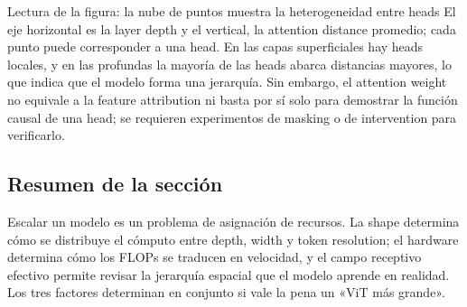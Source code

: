 
\begin{knowledgebox}{Lectura de la figura: la nube de puntos muestra la heterogeneidad entre heads}
El eje horizontal es la layer depth y el vertical, la attention distance promedio; cada punto puede corresponder a una head. En las capas superficiales hay heads locales, y en las profundas la mayoría de las heads abarca distancias mayores, lo que indica que el modelo forma una jerarquía. Sin embargo, el attention weight no equivale a la feature attribution ni basta por sí solo para demostrar la función causal de una head; se requieren experimentos de masking o de intervention para verificarlo.
\end{knowledgebox}


\subsection{Resumen de la sección}

Escalar un modelo es un problema de asignación de recursos. La shape determina cómo se distribuye el cómputo entre depth, width y token resolution; el hardware determina cómo los FLOPs se traducen en velocidad, y el campo receptivo efectivo permite revisar la jerarquía espacial que el modelo aprende en realidad. Los tres factores determinan en conjunto si vale la pena un «ViT más grande».
